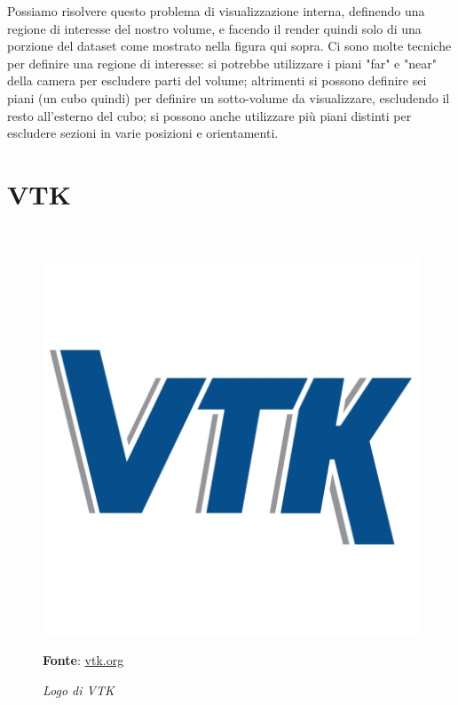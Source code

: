 Possiamo risolvere questo problema di visualizzazione interna, definendo una regione di interesse del nostro volume, e facendo il render quindi solo di una porzione del dataset come mostrato nella figura qui sopra. Ci sono molte tecniche per definire una regione di interesse: si potrebbe utilizzare i piani "far" e "near" della camera per escludere parti del volume; altrimenti si possono definire sei piani (un cubo quindi) per definire un sotto-volume da visualizzare, escludendo il resto all'esterno del cubo; si possono anche utilizzare più piani distinti per escludere sezioni in varie posizioni e orientamenti.

\section{VTK}
\\

\begin{figure}[h]
    \centering
    \includegraphics[scale=0.1]{immagini/volumerendering/VTK_logo.png}
    \caption{\textit{Logo di VTK}}
    \textbf{Fonte}: \href{https://vtk.org/}{vtk.org}
    \label{fig: Logo VTK}
\end{figure}
